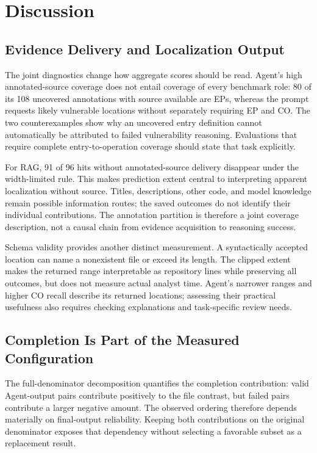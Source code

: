 \section{Discussion}
\subsection{Evidence Delivery and Localization Output}
The joint diagnostics change how aggregate scores should be read. Agent's high annotated-source coverage does not entail coverage of every benchmark role: 80 of its 108 uncovered annotations with source available are EPs, whereas the prompt requests likely vulnerable locations without separately requiring EP and CO. The two counterexamples show why an uncovered entry definition cannot automatically be attributed to failed vulnerability reasoning. Evaluations that require complete entry-to-operation coverage should state that task explicitly.

For RAG, 91 of 96 hits without annotated-source delivery disappear under the width-limited rule. This makes prediction extent central to interpreting apparent localization without source. Titles, descriptions, other code, and model knowledge remain possible information routes; the saved outcomes do not identify their individual contributions. The annotation partition is therefore a joint coverage description, not a causal chain from evidence acquisition to reasoning success.

Schema validity provides another distinct measurement. A syntactically accepted location can name a nonexistent file or exceed its length. The clipped extent makes the returned range interpretable as repository lines while preserving all outcomes, but does not measure actual analyst time. Agent's narrower ranges and higher CO recall describe its returned locations; assessing their practical usefulness also requires checking explanations and task-specific review needs.

\subsection{Completion Is Part of the Measured Configuration}
The full-denominator decomposition quantifies the completion contribution: valid Agent-output pairs contribute positively to the file contrast, but failed pairs contribute a larger negative amount. The observed ordering therefore depends materially on final-output reliability. Keeping both contributions on the original denominator exposes that dependency without selecting a favorable subset as a replacement result.

